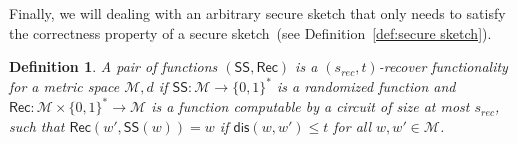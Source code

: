\documentclass[11pt]{article}
\newcommand{\defref}[1]{\mbox{Definition~\ref{#1}}}
\newcommand{\class}[1]{{\ensuremath{\mathsf{#1}}}}
\newcommand{\sketch}{\ensuremath{\class{SS}}\xspace}
\newcommand{\rec}{\ensuremath{\class{Rec}}\xspace}
\newcommand{\dis}{\ensuremath{\mathsf{dis}}}
\newcommand{\hill}{\ensuremath{\mathtt{HILL}}\xspace}
\newcommand{\Hoo}{\mathrm{H}_\infty}
\newtheorem{theorem}{Theorem}[section]
\newtheorem{definition}[theorem]{Definition}
\newcommand{\ignore}[1]{}
\begin{document}
Finally, we will dealing with an arbitrary secure sketch that only needs to satisfy the correctness property of a secure sketch~(see \defref{def:secure sketch}).  

\begin{definition}
A pair of functions $(\sketch, \rec) $ is a $(s_{rec}, t)$-\emph{recover functionality for a metric space $\mathcal{M}, d$} if $\sketch : \mathcal{M}\rightarrow \{0,1 \}^*$ is a randomized function and $\rec: \mathcal{M}\times \{0, 1\}^*\rightarrow \mathcal{M}$ is a function computable by a circuit of size at most $s_{rec}$, such that $\rec (w', \sketch (w)) = w$ if $\dis(w, w')\leq t$ for all $w, w' \in \mathcal{M}$.
\end{definition}

\ignore{For any recover functionality, there is an inherent tradeoff between the ability to keep points stationary and to perform error correction.

\begin{theorem}\label{thm:compSketchImpUniform}
Let $\mathcal{M}, d$ be a metric space that is $(s_{neigh}, t)$-neighborhood samplable and $(t, c)$-distance regular.
Furthermore, let $(\sketch, \rec)$ be any $(s_{rec}, t)$-recover functionality for $\mathcal{M}, d$.  Then $H^\hill_{\epsilon, s}( U |\sketch(U))\not \geq \Hoo(U)$ for $s \approx (s_{neigh} + 2s_{rec})$ and $\epsilon=1/2$~(if $s_{neigh}, s_{rec}$ are polynomial so is $s$).
\end{theorem}

}
\end{document}
